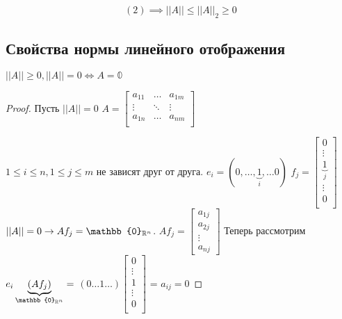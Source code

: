\documentclass[main]{subfiles}
\begin{document}
\[(2) \implies ||A|| \leq ||A||_2 \geq 0\]

\subsection*{Свойства нормы линейного отображения}
 \begin{theorem}$||A|| \geq 0, ||A|| = 0 \Leftrightarrow A = \mathbb{0}$ \end{theorem}
    \begin{proof}
        Пусть $||A|| = 0$ 
        $A = \begin{bmatrix}
            a_{11} & \ldots & a_{1m} \\
            \vdots & \ddots & \vdots \\
            a_{1n} & \ldots & a_{nm} \\
        \end{bmatrix}$
        
        $1 \leq i \leq n, 1 \leq j \leq m$ не зависят друг от друга.
        \newline
        $e_i = (0, \ldots, \underbrace{1}_i, \ldots 0)$
        $f_j = \begin{bmatrix}
            0 \\
            \vdots \\
            \underbrace{1}_j \\
            \vdots \\
            0 \\ \end{bmatrix}$
        \newline
        $||A|| = 0 \rightarrow Af_j = \mathbb{0}_{{\vR}^n} $.
        $Af_j =
        \begin{bmatrix}
            a_{1j} \\
            a_{2j}\\
            \vdots \\
            a_{nj}
        \end{bmatrix} $
        Теперь рассмотрим $e_i \underbrace{(Af_j)}_{\mathbb{0}_{{\vR}^n}} =$
        $ (0 \ldots 1 \ldots) \begin{bmatrix}
            0 \\
            \vdots \\
            1 \\
            \vdots \\
            0 \\ \end{bmatrix}$ = $a_{ij} = 0$
    \end{proof}
\end{document}
